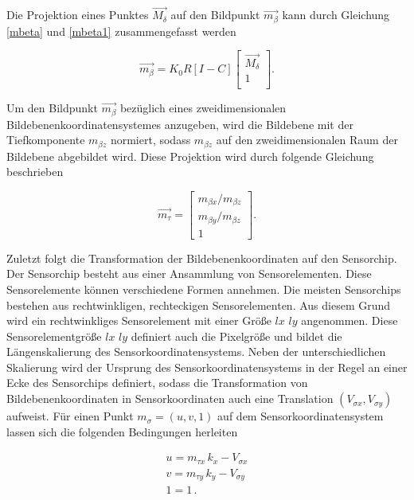 Die Projektion eines Punktes $\overrightarrow{M_\delta}$ auf den Bildpunkt $\overrightarrow{m_{\beta}}$ kann durch Gleichung \ref{mbeta} und \ref{mbeta1} zusammengefasst werden

\begin{equation}
\overrightarrow{m_\beta}
=K_0 R	[I -C] \begin{bmatrix}
\overrightarrow{M_\delta}\\
1\\
\end{bmatrix} .
\end{equation}


Um den Bildpunkt $\overrightarrow{m_{\beta}}$ bezüglich eines zweidimensionalen Bildebenenkoordinatensystemes anzugeben, wird die Bildebene mit der Tiefkomponente $m_{\beta z}$ normiert, sodass $m_{\beta z}$ auf den zweidimensionalen Raum der Bildebene abgebildet wird. Diese Projektion wird durch folgende Gleichung beschrieben

\begin{equation}
\overrightarrow{m_\tau} =
\begin{bmatrix}
m_{\beta x}/m_{\beta z}\\m_{\beta y}/m_{\beta z}\\1
\end{bmatrix}.
\end{equation}


Zuletzt folgt die Transformation der Bildebenenkoordinaten auf den Sensorchip. Der Sensorchip besteht aus einer Ansammlung von Sensorelementen. Diese Sensorelemente können verschiedene Formen annehmen. Die meisten Sensorchips bestehen aus rechtwinkligen, rechteckigen Sensorelementen. Aus diesem Grund wird ein rechtwinkliges Sensorelement mit einer Größe $lx$ $ly$ angenommen. Diese Sensorelementgröße $lx$ $ly$ definiert auch die Pixelgröße und bildet die Längenskalierung des Sensorkoordinatensystems. Neben der unterschiedlichen Skalierung wird der Ursprung des Sensorkoordinatensystems in der Regel an einer Ecke des Sensorchips definiert, sodass die Transformation von Bildebenenkoordinaten in Sensorkoordinaten auch eine Translation $(V_{\sigma x},V_{\sigma y})$ aufweist\cite{HZ,Photonik}. Für einen Punkt $m_\sigma = ({u},{v},1)$ auf dem Sensorkoordinatensystem lassen sich die folgenden Bedingungen herleiten 

\begin{gather}	
	{u}=m_{\tau x} \, k_x - V_{\sigma x}\\
	{v}=m_{\tau y} \, k_y - V_{\sigma y}\\
	1=1\,.
\end{gather}


